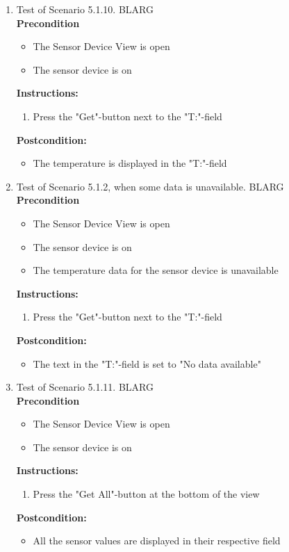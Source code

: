 \documentclass[a4paper]{article}
\newlength{\testlabellength}
\newenvironment{testlist}{\begin{enumerate}[label=\bfseries Instruction \thesubsection.\arabic* , labelindent=0pt, labelwidth=\testlabellength , leftmargin=2cm]}{\end{enumerate}}
\newenvironment{precondition}{
{\color{white}BLARG}\\ 
\textbf{Precondition}
\begin{itemize}[labelindent=0cm, labelwidth=2cm , leftmargin=1cm]
}
{\end{itemize}}
\newenvironment{instruction}{
\textbf{Instructions:}
\begin{enumerate}[label=\bfseries  \arabic*., labelindent=0cm, labelwidth=2cm , leftmargin=1cm]
}
{\end{enumerate}}
\newenvironment{postcondition}{
\textbf{Postcondition:}
\begin{itemize}[labelindent=0cm, labelwidth=2cm , leftmargin=1cm]
}
{\end{itemize}}
\begin{document}
\begin{appendices}
\begin{testlist}
	\item  Test of Scenario 5.1.10.
		\begin{precondition}
			\item The Sensor Device View is open
			\item The sensor device is on
		\end{precondition}
		\begin{instruction}
			\item Press the "Get"-button next to the "T:"-field
		\end{instruction}
		\begin{postcondition}
			\item The temperature is displayed in the "T:"-field
		\end{postcondition}

	\item  Test of Scenario 5.1.2, when some data is unavailable.
		\begin{precondition}
			\item The Sensor Device View is open
			\item The sensor device is on
			\item The temperature data for the sensor device is unavailable
		\end{precondition}
		\begin{instruction}
			\item Press the "Get"-button next to the "T:"-field
		\end{instruction}
		\begin{postcondition}
			\item The text in the "T:"-field is set to "No data available"
		\end{postcondition}
        
\newpage
	\item  Test of Scenario 5.1.11.
		\begin{precondition} 
			\item The Sensor Device View is open
			\item The sensor device is on
		\end{precondition}
		\begin{instruction}
			\item Press the "Get All"-button at the bottom of the view
		\end{instruction}
		\begin{postcondition}
			\item All the sensor values are displayed in their respective field
		\end{postcondition}


\end{testlist}
\end{appendices}
\end{document}
